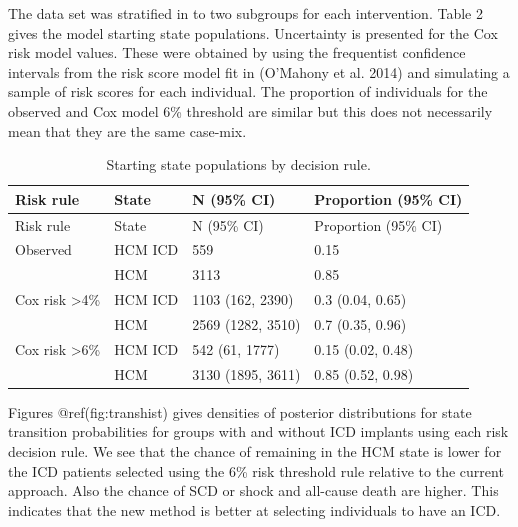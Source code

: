 \documentclass[
]{article}
\begin{document}
The data set was stratified in to two subgroups for each intervention.
Table 2 gives the model starting state populations. Uncertainty is
presented for the Cox risk model values. These were obtained by using
the frequentist confidence intervals from the risk score model fit in
(O'Mahony et al. 2014) and simulating a sample of risk scores for each
individual. The proportion of individuals for the observed and Cox model
6\% threshold are similar but this does not necessarily mean that they
are the same case-mix.

\begin{longtable}[]{@{}llll@{}}
\caption{Starting state populations by decision rule.}\tabularnewline
\toprule
Risk rule & State & N (95\% CI) & Proportion (95\% CI) \\
\midrule
\endfirsthead
\toprule
Risk rule & State & N (95\% CI) & Proportion (95\% CI) \\
\midrule
\endhead
Observed & HCM ICD & 559 & 0.15 \\
& HCM & 3113 & 0.85 \\
Cox risk \textgreater4\% & HCM ICD & 1103 (162, 2390) & 0.3 (0.04,
0.65) \\
& HCM & 2569 (1282, 3510) & 0.7 (0.35, 0.96) \\
Cox risk \textgreater6\% & HCM ICD & 542 (61, 1777) & 0.15 (0.02,
0.48) \\
& HCM & 3130 (1895, 3611) & 0.85 (0.52, 0.98) \\
\bottomrule
\end{longtable}

Figures @ref(fig:transhist) gives densities of posterior distributions
for state transition probabilities for groups with and without ICD
implants using each risk decision rule. We see that the chance of
remaining in the HCM state is lower for the ICD patients selected using
the 6\% risk threshold rule relative to the current approach. Also the
chance of SCD or shock and all-cause death are higher. This indicates
that the new method is better at selecting individuals to have an ICD.
\end{document}

